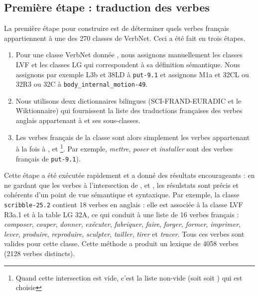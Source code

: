 \subsection{Première étape : traduction des verbes}\label{first}

La première étape pour construire \verbenet{} est de déterminer quels verbes
français appartiennent à une des 270 classes de VerbNet. Ceci a été fait en
trois étapes.

\begin{enumerate}
    \item Pour une classe VerbNet donnée \Ce{}, nous assignons manuellement les
        classes LVF \Clvf{} et les classes LG \Clg{} qui correspondent à sa
        définition sémantique. Nous assignons par exemple {\color{red}L3b} et
        {\color{green}38LD} à {\color{blue}\texttt{put-9.1}} et assignons
        {\color{red}M1a} et {\color{green}32CL ou 32R3 ou 32C} à
        {\color{blue}\texttt{body\_internal\_motion-49}}.
    \item Nous utilisons deux dictionnaires bilingues (SCI-FRAND-EURADIC et le
        Wiktionnaire) qui fournissent la liste \Ltrad{} des traductions
        françaises des verbes anglais appartenant à \Ce{} et ses sous-classes.
    \item Les verbes français de la classe \Ce{} sont alors simplement les
        verbes appartenant à la fois à \Ltrad{}, \Clvf{} et
        \Clg{}\footnote{Quand cette intersection est vide, c'est la liste
        non-vide (soit \Clvf{} soit \Clg{}) qui est choisie}. Par exemple,
        \emph{mettre}, \emph{poser} et \emph{installer} sont des verbes
        français de {\color{blue}\texttt{put-9.1}}).
\end{enumerate}

Cette étape a été exécutée rapidement et a donné des résultats encourageants :
en ne gardant que les verbes à l'intersection de \Ltrad{}, \Clvf{} et \Clg{},
les résulstats sont précis et cohérents d'un point de vue sémantique et
syntaxique. Par exemple, la classe {\color{blue}\texttt{scribble-25.2}}
contient 18 verbes en anglais : elle est associée à la classe LVF
{\color{red}R3a.1} et à la table LG {\color{green}32A}, ce qui conduit à une
liste de 16 verbes français : \emph{composer}, \emph{couper}, \emph{donner},
\emph{exécuter}, \emph{fabriquer}, \emph{faire}, \emph{forger}, \emph{former},
\emph{imprimer}, \emph{lever}, \emph{produire}, \emph{reproduire},
\emph{sculpter}, \emph{tailler}, \emph{tirer} et \emph{tracer}. Tous ces verbes
sont valides pour cette classe.  Cette méthode a produit un lexique de 4058
verbes (2128 verbes distincts).

